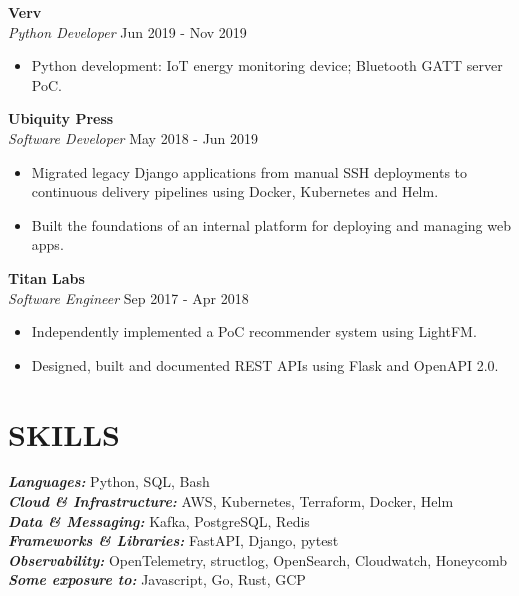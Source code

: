 \documentclass[line,margin]{res}
\begin{document}
\begin{resume}
                \textbf{Verv} \\
                {\sl Python Developer} \hfill        Jun 2019 - Nov 2019 \\
                  \begin{itemize}
                  \item Python development: IoT energy monitoring device; Bluetooth GATT server PoC.
                  \end{itemize}

                \textbf{Ubiquity Press} \\
                {\sl Software Developer} \hfill        May 2018 - Jun 2019 \\
                  \begin{itemize}
                  \item Migrated legacy Django applications from manual SSH deployments
                        to continuous delivery pipelines using Docker, Kubernetes and Helm.
                  \item Built the foundations of an internal platform for deploying and managing
                        web apps.
                  \end{itemize}

	        \textbf{Titan Labs} \\
                {\sl Software Engineer} \hfill         Sep 2017 - Apr 2018 \\
                  \begin{itemize}
                  \item Independently implemented a PoC recommender system using LightFM.
                  \item Designed, built and documented REST APIs using Flask and OpenAPI 2.0.
                  \end{itemize}

\section{SKILLS} {\sl \textbf{Languages:}} Python, SQL, Bash\\
                 {\sl \textbf{Cloud \& Infrastructure:}} AWS, Kubernetes, Terraform, Docker, Helm\\
                 {\sl \textbf{Data \& Messaging:}} Kafka, PostgreSQL, Redis\\
                 {\sl \textbf{Frameworks \& Libraries:}} FastAPI, Django, pytest\\
                 {\sl \textbf{Observability:}} OpenTelemetry, structlog, OpenSearch, Cloudwatch, Honeycomb\\
                 {\sl \textbf{Some exposure to:}} Javascript, Go, Rust, GCP


\end{resume}
\end{document}
